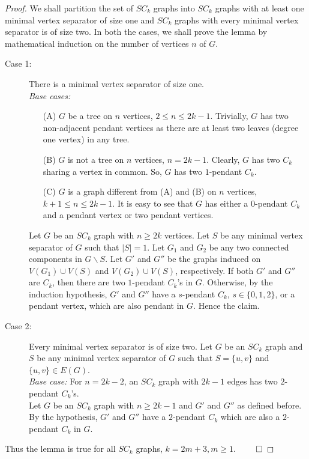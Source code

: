 \documentclass[runningheads]{llncs}
\begin{document}
\begin{proof}
 We shall partition the set of $SC_k$ graphs into $SC_k$ graphs with at least one minimal vertex separator of size one and $SC_k$ graphs with every minimal vertex separator is of size two. In both the cases, we shall prove the lemma by mathematical induction on the number of vertices $n$ of $G$.
\begin{description}
\item[Case 1:] There is a minimal vertex separator of size one. \\
\noindent \emph{Base cases:} 
\begin{itemize}
\item[(A)] $G$ be a tree on $n$ vertices, $2 \leq n \leq 2k-1$. Trivially, $G$ has two non-adjacent pendant vertices as there are at least two leaves (degree one vertex) in any tree.
\item[(B)] $G$ is not a tree on $n$ vertices, $n=2k-1$. Clearly, $G$ has two $C_k$ sharing a vertex in common. So, $G$ has two $1$-pendant $C_k$.
\item[(C)] $G$ is a graph different from (A) and (B) on $n$ vertices, $k+1 \leq n \leq 2k-1$. It is easy to see that $G$ has either a $0$-pendant $C_k$ and a pendant vertex or two pendant vertices.
\end{itemize}
\noindent Let $G$ be an $SC_k$ graph with $n \geq 2k$ vertices. Let $S$ be any minimal vertex separator of $G$ such that $\vert S \vert = 1$. Let $G_1$ and $G_2$ be any two connected components in $G \backslash S$. Let $G'$ and $G''$ be the graphs induced on $V(G_1)\cup V(S)$ and  $V(G_2)\cup V(S)$, respectively. If both $G'$ and $G''$ are $C_k$, then there are two $1$-pendant $C_k$'s in $G$. Otherwise, by the induction hypothesis, $G'$ and $G''$ have a $s$-pendant $C_k$, $s \in \{0,1,2\}$, or a pendant vertex, which are also pendant in $G$. Hence the claim.
\item[Case 2:] Every minimal vertex separator is of size two. Let $G$ be an $SC_k$ graph and $S$ be any minimal vertex separator of $G$ such that $S = \{u, v\}$ and $\{u,v\} \in E(G)$.\\
\noindent \emph{Base case:} For $n=2k-2$, an $SC_k$ graph with $2k-1$ edges has two $2$-pendant $C_k$'s.\\
\noindent Let $G$ be an $SC_k$ graph with $n \geq 2k-1$ and $G'$ and $G''$ as defined before. By the hypothesis, $G'$ and $G''$ have a $2$-pendant $C_k$ which are also a $2$-pendant $C_k$ in $G$.
\end{description}
Thus the lemma is true for all $SC_k$ graphs, $k=2m+3, m \geq 1$. $\hfill \qed$

\end{proof}
\end{document}
